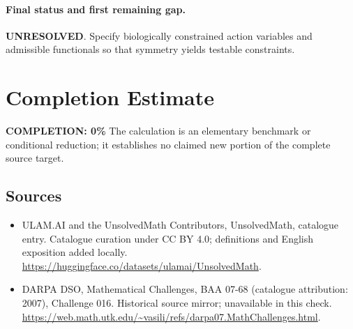 \documentclass[11pt]{article}
\begin{document}
\paragraph{Final status and first remaining gap.}
\textbf{UNRESOLVED}. Specify biologically constrained action variables and admissible functionals so that symmetry yields testable constraints.

\section{Completion Estimate}
\noindent\textbf{COMPLETION: 0\%}
The calculation is an elementary benchmark or conditional reduction; it establishes no claimed new portion of the complete source target.

\subsection{Sources}
\begin{itemize}
\item[\hypertarget{source:statement:1}{S1}] ULAM.AI and the UnsolvedMath Contributors, UnsolvedMath, catalogue entry. Catalogue curation under CC BY 4.0; definitions and English exposition added locally.
\url{https://huggingface.co/datasets/ulamai/UnsolvedMath}.
\item[\hypertarget{source:statement:2}{S2}] DARPA DSO, Mathematical Challenges, BAA 07-68 (catalogue attribution: 2007), Challenge 016. Historical source mirror; unavailable in this check.
\url{https://web.math.utk.edu/~vasili/refs/darpa07.MathChallenges.html}.
\end{itemize}
\label{end:statement}
\end{document}
